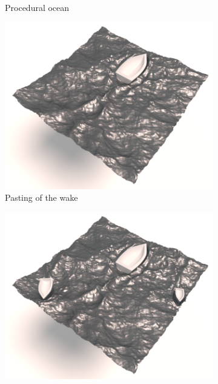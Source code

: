 \begin{figure}[!h]
\begin{subfigure}[b]{0.40\linewidth}
		\caption{\label{fig:result_detail:ocean}\scriptsize{Procedural ocean}}
	\end{subfigure}
	\hspace{0.1cm}
	\begin{subfigure}[b]{0.40\linewidth}
		\centering
		\includegraphics[width=\textwidth]{images/fluidsculpting-mig2016/results/boatOnOcean.png}
		\caption{\label{fig:result_detail:paste}\scriptsize{Pasting of the wake}}
	\end{subfigure}
	\hspace{0.1cm}
	\begin{subfigure}[b]{0.40\linewidth}
		\centering
		\includegraphics[width=\textwidth]{images/fluidsculpting-mig2016/results/threeBoatsOnOcean.png}

\end{subfigure}
\end{figure}
